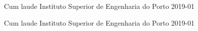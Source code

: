 




\begin{cvhonors}

  \cvhonor
    {Cum laude} %
    {Instituto Superior de Engenharia do Porto} %
    {} %
    {2019-01} %


\end{cvhonors}




\begin{cvhonors}

  \cvhonor
  {Cum laude} %
  {Instituto Superior de Engenharia do Porto} %
  {} %
  {2019-01} %


\end{cvhonors}

